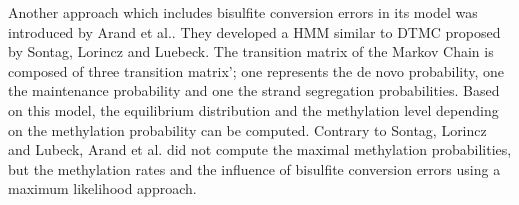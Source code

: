 Another approach which includes bisulfite conversion errors in its model was introduced by Arand et al..\cite{Wolf} They developed a \ac{HMM} similar to \ac{DTMC} proposed by Sontag, Lorincz and Luebeck.\cite{Sontag} The transition matrix of the Markov Chain is composed of three transition matrix'; one represents the de novo probability, one the maintenance probability and one the strand segregation probabilities. Based on this model, the equilibrium distribution and the methylation level depending on the methylation probability can be computed. Contrary to Sontag, Lorincz and Lubeck, Arand et al. did not compute the maximal methylation probabilities, but the methylation rates and the influence of bisulfite conversion errors using a maximum likelihood approach.\cite{Wolf}\\

